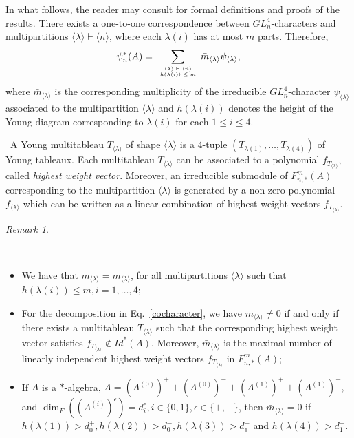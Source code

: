 \documentclass[11pt]{amsart}
\theoremstyle{definition}
\theoremstyle{remark}
\newtheorem{remark}[theorem]{Remark}
\begin{document}
	
	In what follows, the reader may consult \cite{livro} for formal definitions and proofs of the results. There exists a one-to-one correspondence between $GL_n^4$-characters and multipartitions $\langle \lambda\rangle\vdash \langle n\rangle$, where each $\lambda(i)$ has at most $m$ parts. Therefore,\begin{equation}\label{cocharacter}
	\psi_n^*(A)=	\displaystyle \displaystyle{\sum_{ \tiny{\begin{array}{ccc}
						\langle \lambda \rangle \vdash \langle n\rangle\\
						h(\lambda(i))\leq m
		\end{array}}}} \bar{m}_{\langle \lambda \rangle}\psi_{\langle \lambda \rangle},
	\end{equation} where $\bar{m}_{\langle \lambda \rangle}$ is the corresponding multiplicity of the irreducible $GL_n^4$-character $\psi_{\langle \lambda \rangle}$ associated to the multipartition $\langle \lambda \rangle$ and $h(\lambda(i))$ denotes the height of the Young diagram corresponding to $\lambda(i)$ for each $1\le i\le 4$.
	
	\ A Young multitableau $T_{\langle \lambda \rangle}$ of shape $\langle \lambda \rangle$ is a 4-tuple $(T_{\lambda(1)},\ldots, T_{\lambda(4)})$ of Young tableaux. Each multitableau $T_{\langle \lambda \rangle}$ can be associated to a polynomial $f_{
	T_{\langle \lambda \rangle}},$ called {\em highest weight vector}. Moreover, an irreducible submodule of $F^m_{n,*}(A)$ corresponding to the multipartition $\langle \lambda \rangle$ is generated by a non-zero polynomial $f_{\langle \lambda \rangle}$ which can be written as a linear combination of highest weight vectors $f_{
	T_{\langle \lambda \rangle}}.$
	
	\begin{remark}\label{multiplicities}
		
		\
		
		\begin{itemize}
			\item[1.] We have that  $m_{\langle \lambda \rangle}=\bar{m}_{\langle \lambda \rangle}$, for all multipartitions $\langle \lambda \rangle$ such that $h(\lambda(i))\leq m, i=1,\ldots,4$;
			
			\item[2.] For the decomposition in Eq.~\eqref{cocharacter}, we have $\bar{m}_{\langle \lambda \rangle}\neq 0$ if and only if there exists a multitableau $T_{\langle \lambda \rangle}$ such that the corresponding highest weight vector satisfies $f_{T_{\langle \lambda \rangle}}\notin Id^{*}(A)$. Moreover, $\bar{m}_{\langle \lambda \rangle}$ is the maximal
			number of linearly independent highest weight vectors $f_{T_{\langle \lambda \rangle}}$ in $F^m_{n,*}(A)$;
			\item[3.] If $A$ is a $*$-algebra, $A=(A^{(0)})^+ +(A^{(0)})^- + (A^{(1)})^+ + (A^{(1)})^-,$ and $\dim_F((A^{(i)})^{\epsilon})=d_i^{\epsilon}, i\in \{0,1\},\epsilon\in\{+,-\}$, then $\bar{m}_{\langle \lambda \rangle}= 0$ if $h(\lambda(1))>d_0^+, h(\lambda(2))>d_0^-,h(\lambda(3))>d_1^+$ and $h(\lambda(4))>d_1^-.$
		\end{itemize}
		
	\end{remark}
	
\end{document}
